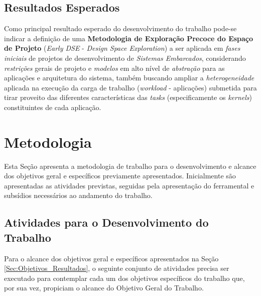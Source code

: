 \documentclass[tese-proposta,nocipinfo]{texufpel}
\begin{document}
\section{Resultados Esperados}
Como principal resultado esperado do desenvolvimento do trabalho pode-se indicar a definição de uma \textbf{Metodologia de Exploração Precoce do Espaço de Projeto} (\textit{Early DSE} - \textit{Design Space Exploration}) a ser aplicada em \textit{fases iniciais} de projetos de desenvolvimento de \textit{Sistemas Embarcados}, considerando \textit{restrições} gerais de projeto e \textit{modelos} em alto nível de \textit{abstração} para as aplicações e arquitetura do sistema, também buscando ampliar a \textit{heterogeneidade} aplicada na execução da carga de trabalho (\textit{workload} - aplicações) submetida para tirar proveito das diferentes características das \textit{tasks} (especificamente os \textit{kernels}) constituintes de cada aplicação.



\chapter{Metodologia}\label{sec:Metodologia}

Esta Seção apresenta a metodologia de trabalho para o desenvolvimento e alcance dos objetivos geral e específicos previamente apresentados. Inicialmente são apresentadas as atividades previstas, seguidas pela apresentação do ferramental e subsídios necessários ao andamento do trabalho.


\section{Atividades para o Desenvolvimento do Trabalho}
Para o alcance dos objetivos geral e específicos apresentados na Seção \ref{Sec:Objetivos_Resultados}, o seguinte conjunto de atividades precisa ser executado para contemplar cada um dos objetivos específicos do trabalho que, por sua vez, propiciam o alcance do Objetivo Geral do Trabalho. 
\end{document}
